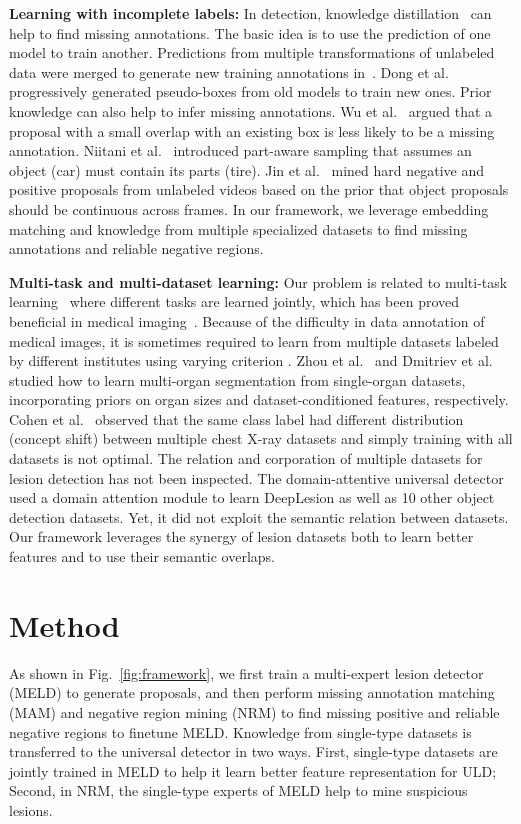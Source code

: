 \documentclass[runningheads]{llncs}
\def\Fig#1{{Fig.~\ref{fig:#1}}}
\def\etal{{et al.}}
\begin{document}
{\bf Learning with incomplete labels:} In detection, knowledge distillation~\cite{Hinton2014distill} can help to find missing annotations. The basic idea is to use the prediction of one model to train another. Predictions from multiple transformations of unlabeled data were merged to generate new training annotations in~\cite{Radosavovic2017data}. Dong \etal~\cite{Dong2019few} progressively generated pseudo-boxes from old models to train new ones. Prior knowledge can also help to infer missing annotations. Wu \etal~\cite{Wu2019soft} argued that a proposal with a small overlap with an existing box is less likely to be a missing annotation. Niitani \etal~\cite{Niitani2019sample} introduced part-aware sampling that assumes an object (car) must contain its parts (tire). Jin \etal~\cite{Jin2018mining} mined hard negative and positive proposals from unlabeled videos based on the prior that object proposals should be continuous across frames. In our framework, we leverage embedding matching and knowledge from multiple specialized datasets to find missing annotations and reliable negative regions.

{\bf Multi-task and multi-dataset learning:} Our problem is related to multi-task learning~\cite{Pan2010transfer} where different tasks are learned jointly, which has been proved beneficial in medical imaging~\cite{Xu2018less,Harouni2018universal,Yan2019MULAN}. Because of the difficulty in data annotation of medical images, it is sometimes required to learn from multiple datasets labeled by different institutes using varying criterion \cite{Tajbakhsh2020imperfect}. Zhou \etal~\cite{Zhou2019organ} and Dmitriev \etal~\cite{Dmitriev2019seg} studied how to learn multi-organ segmentation from single-organ datasets, incorporating priors on organ sizes and dataset-conditioned features, respectively. Cohen \etal~\cite{Cohen2020domain} observed that the same class label had different distribution (concept shift) between multiple chest X-ray datasets and simply training with all datasets is not optimal. The relation and corporation of multiple datasets for lesion detection has not been inspected. The domain-attentive universal detector~\cite{Wang2019universal} used a domain attention module to learn DeepLesion as well as 10 other object detection datasets. Yet, it did not exploit the semantic relation between datasets. Our framework leverages the synergy of lesion datasets both to learn better features and to use their semantic overlaps.

\section{Method}
\label{sec:method}
As shown in \Fig{framework}, we first train a multi-expert lesion detector (MELD) to generate proposals, and then perform missing annotation matching (MAM) and negative region mining (NRM) to find missing positive and reliable negative regions to finetune MELD. Knowledge from single-type datasets is transferred to the universal detector in two ways. First, single-type datasets are jointly trained in MELD to help it learn better feature representation for ULD; Second, in NRM, the single-type experts of MELD help to mine suspicious lesions.
\end{document}
